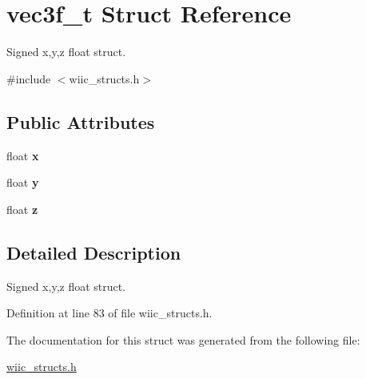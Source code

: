 \hypertarget{structvec3f__t}{\section{vec3f\-\_\-t \-Struct \-Reference}
\label{structvec3f__t}
}


\-Signed x,y,z float struct.  




{\ttfamily \#include $<$wiic\-\_\-structs.\-h$>$}

\subsection*{\-Public \-Attributes}
\begin{DoxyCompactItemize}
\item 
\hypertarget{structvec3f__t_a60f26fe901d34ae1b005343ef46b0eb9}{float {\bfseries x}}\label{structvec3f__t_a60f26fe901d34ae1b005343ef46b0eb9}

\item 
\hypertarget{structvec3f__t_a0758f3425f05e7419d04b3e7e588dbac}{float {\bfseries y}}\label{structvec3f__t_a0758f3425f05e7419d04b3e7e588dbac}

\item 
\hypertarget{structvec3f__t_a7994ca5509a9bc1c5ad399a31bdef420}{float {\bfseries z}}\label{structvec3f__t_a7994ca5509a9bc1c5ad399a31bdef420}

\end{DoxyCompactItemize}


\subsection{\-Detailed \-Description}
\-Signed x,y,z float struct. 

\-Definition at line 83 of file wiic\-\_\-structs.\-h.



\-The documentation for this struct was generated from the following file\-:\begin{DoxyCompactItemize}
\item 
\hyperlink{wiic__structs_8h}{wiic\-\_\-structs.\-h}\end{DoxyCompactItemize}
